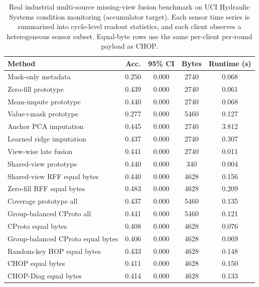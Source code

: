 \begin{table}[t]
\centering
\caption{Real industrial multi-source missing-view fusion benchmark on UCI Hydraulic Systems condition monitoring (accumulator target). Each sensor time series is summarized into cycle-level readout statistics, and each client observes a heterogeneous sensor subset. Equal-byte rows use the same per-client per-round payload as CHOP.}
\label{tab:if-hydraulic-fusion}
\scriptsize
\setlength{\tabcolsep}{3pt}
\renewcommand{\arraystretch}{0.94}
\begin{tabular}{lcccc}
\toprule
Method & Acc. & 95\% CI & Bytes & Runtime (s) \\
\midrule
Mask-only metadata & 0.250 & 0.000 & 2740 & 0.068 \\
Zero-fill prototype & 0.439 & 0.000 & 2740 & 0.061 \\
Mean-impute prototype & 0.440 & 0.000 & 2740 & 0.068 \\
Value+mask prototype & 0.277 & 0.000 & 5460 & 0.127 \\
Anchor PCA imputation & 0.445 & 0.000 & 2740 & 3.812 \\
Learned ridge imputation & 0.437 & 0.000 & 2740 & 0.307 \\
View-wise late fusion & 0.441 & 0.000 & 2740 & 0.011 \\
Shared-view prototype & 0.440 & 0.000 & 340 & 0.004 \\
Shared-view RFF equal bytes & 0.440 & 0.000 & 4628 & 0.156 \\
Zero-fill RFF equal bytes & 0.483 & 0.000 & 4628 & 0.209 \\
Coverage prototype all & 0.437 & 0.000 & 5460 & 0.135 \\
Group-balanced CProto all & 0.441 & 0.000 & 5460 & 0.121 \\
CProto equal bytes & 0.408 & 0.000 & 4628 & 0.076 \\
Group-balanced CProto equal bytes & 0.406 & 0.000 & 4628 & 0.069 \\
Random-key HOP equal bytes & 0.433 & 0.000 & 4628 & 0.148 \\
CHOP equal bytes & 0.411 & 0.000 & 4628 & 0.150 \\
CHOP-Diag equal bytes & 0.414 & 0.000 & 4628 & 0.133 \\
\bottomrule
\end{tabular}
\end{table}
